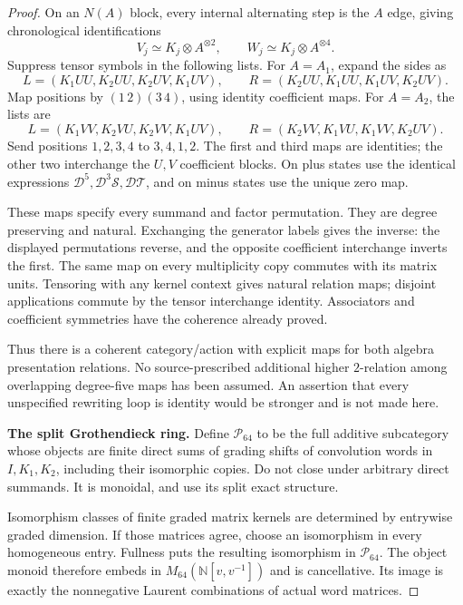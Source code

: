 \documentclass[11pt,a4paper]{article}
\theoremstyle{named}\newtheorem{finding}{Finding}[section]
\theoremstyle{definition}\newtheorem{definition}[finding]{Definition}
\theoremstyle{remark}\newtheorem{remark}[finding]{Remark}
\begin{document}
\begin{proof}
On an $N(A)$ block, every internal alternating step
is the $A$ edge, giving chronological identifications
\[
 V_j\simeq K_j\otimes A^{\otimes2},\qquad
 W_j\simeq K_j\otimes A^{\otimes4}.
\]
Suppress tensor symbols in the following lists.
For $A=A_1$, expand the sides as
\[
 L=(K_1UU,K_2UU,K_2UV,K_1UV),\qquad
 R=(K_2UU,K_1UU,K_1UV,K_2UV).
\]
Map positions by $(1\,2)(3\,4)$, using identity
coefficient maps.
For $A=A_2$, the lists are
\[
 L=(K_1VV,K_2VU,K_2VV,K_1UV),\qquad
 R=(K_2VV,K_1VU,K_1VV,K_2UV).
\]
Send positions $1,2,3,4$ to $3,4,1,2$.
The first and third maps are identities; the other two
interchange the $U,V$ coefficient blocks.
On plus states use the identical expressions
$\mathcal D^5,\mathcal D^3\mathcal S,\mathcal D\mathcal T$,
and on minus states use the unique zero map.

These maps specify every summand and factor permutation.
They are degree preserving and natural.
Exchanging the generator labels gives the inverse:
the displayed permutations reverse, and the opposite
coefficient interchange inverts the first.
The same map on every multiplicity copy commutes with
its matrix units.
Tensoring with any kernel context gives natural relation
maps; disjoint applications commute by the tensor
interchange identity.
Associators and coefficient symmetries have the coherence
already proved.

Thus there is a coherent category/action with explicit
maps for both algebra presentation relations.
No source-prescribed additional higher $2$-relation
among overlapping degree-five maps has been assumed.
An assertion that every unspecified rewriting loop is
identity would be stronger and is not made here.

\par\smallskip\noindent\textbf{The split Grothendieck ring.}\quad
Define $\mathcal P_{64}$ to be the full additive
subcategory whose objects are finite direct sums of
grading shifts of convolution words in $I,K_1,K_2$,
including their isomorphic copies.
Do not close under arbitrary direct summands.
It is monoidal, and use its split exact structure.

Isomorphism classes of finite graded matrix kernels
are determined by entrywise graded dimension.
If those matrices agree, choose an isomorphism in every
homogeneous entry. Fullness puts the resulting
isomorphism in $\mathcal P_{64}$.
The object monoid therefore embeds in
$M_{64}(\mathbb N[v,v^{-1}])$ and is cancellative.
Its image is exactly the nonnegative Laurent
combinations of actual word matrices.


\end{proof}
\end{document}
